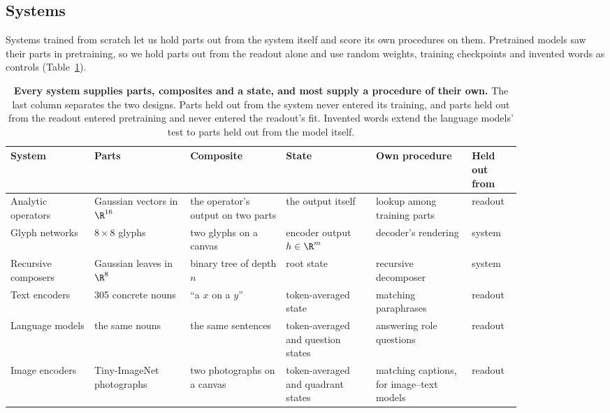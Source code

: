 \subsection{Systems}

Systems trained from scratch let us hold parts out from the system itself and score its own procedures on them. Pretrained models saw their parts in pretraining, so we hold parts out from the readout alone and use random weights, training checkpoints and invented words as controls (Table~\ref{tab:systems}).

\begin{table}[t]
  \centering
  \small
  \caption{\textbf{Every system supplies parts, composites and a state, and most supply a procedure of their own.} The last column separates the two designs. Parts held out from the system never entered its training, and parts held out from the readout entered pretraining and never entered the readout's fit. Invented words extend the language models' test to parts held out from the model itself.}
  \label{tab:systems}
  \begin{tabular}{@{}p{0.14\linewidth}p{0.16\linewidth}p{0.16\linewidth}p{0.15\linewidth}p{0.16\linewidth}p{0.08\linewidth}@{}}
    \toprule
    System & Parts & Composite & State & Own procedure & Held out from \\
    \midrule
    Analytic operators & Gaussian vectors in $\R^{16}$ & the operator's output on two parts & the output itself & lookup among training parts & readout \\
    Glyph networks & $8 \times 8$ glyphs & two glyphs on a canvas & encoder output $h \in \R^m$ & decoder's rendering & system \\
    Recursive composers & Gaussian leaves in $\R^8$ & binary tree of depth $n$ & root state & recursive decomposer & system \\
    Text encoders & 305 concrete nouns & ``a $x$ on a $y$'' & token-averaged state & matching paraphrases & readout \\
    Language models & the same nouns & the same sentences & token-averaged and question states & answering role questions & readout \\
    Image encoders & Tiny-ImageNet photographs & two photographs on a canvas & token-averaged and quadrant states & matching captions, for image--text models & readout \\
    \bottomrule
  \end{tabular}
\end{table}


